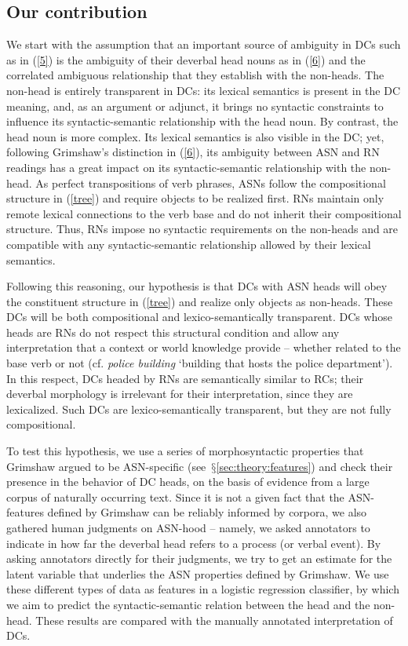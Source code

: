 \documentclass[output=paper]{langsci/langscibook}
\begin{document}
\subsection{Our contribution}\label{sec:intro:contribution}
 We start with the assumption that an important source of ambiguity  in DCs such as in (\ref{5}) is the ambiguity of their deverbal head nouns as in (\ref{6}) and the correlated ambiguous relationship that they establish with the non-heads.  The non-head is entirely transparent in DCs: its lexical semantics is present in the DC meaning, and, as an argument or adjunct, it brings no syntactic constraints to influence its syntactic-semantic relationship with the head noun. By contrast, the head noun is more complex. Its lexical semantics is also visible in the DC; yet, following Grimshaw's distinction in (\ref{6}), its ambiguity between ASN and RN readings has a great impact on its syntactic-semantic relationship with the non-head. As perfect  transpositions of verb phrases, ASNs follow the compositional structure in (\ref{tree}) and require objects to be realized first. RNs maintain only remote lexical connections to the verb base and do not inherit their compositional structure. Thus, RNs impose no syntactic requirements on the non-heads and are compatible with any syntactic-semantic relationship allowed by their lexical semantics.


 Following this reasoning, our hypothesis is that DCs with ASN heads will obey the constituent structure  in (\ref{tree}) and realize only objects as non-heads. These DCs will be both compositional  and lexico-semantically transparent. DCs whose heads are RNs  do not respect this structural condition and allow any interpretation that a context  or world knowledge provide -- whether related to the base verb or not  (cf. \textit{police building} \lq building that hosts the police department\rq). In this respect, DCs headed by RNs are semantically similar to RCs; their deverbal morphology is irrelevant for their interpretation, since they are lexicalized.  Such DCs are lexico-semantically transparent, but they are not fully compositional.


To test this hypothesis, we  use a series of morphosyntactic properties that Grimshaw argued to be ASN-specific (see~$§$\ref{sec:theory:features})  and check their presence in the behavior of DC heads, on the basis of evidence from a large corpus of naturally occurring text.  
 Since it is not a given fact that the ASN-features defined by Grimshaw can be reliably informed by corpora, we also gathered human judgments on ASN-hood -- namely, we asked annotators to indicate in how far the deverbal head refers to a process (or verbal event). By asking annotators directly for their judgments, we try to get an estimate for the latent variable that underlies the ASN properties defined by Grimshaw. We use these different types of data as features in a logistic regression classifier, by which we aim to predict the syntactic-semantic relation between the head and the non-head.  These results are compared with the manually annotated interpretation of DCs. 
 
\end{document}
